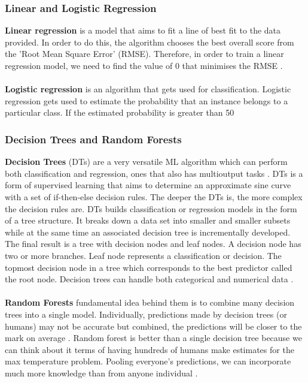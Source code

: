 \documentclass[a4paper,10pt]{article}
\begin{document}
\subsubsection{Linear and Logistic Regression}
\textbf{Linear regression} is a model that aims to fit a line of best fit to the data provided. In order to do this, the algorithm chooses the best overall score from the 'Root Mean Square Error' (RMSE). Therefore, in order to train a linear regression model, we need to find the value of $0$ that minimises the RMSE \cite{geron2019hands}. \\
\\
\textbf{Logistic regression} is an algorithm that gets used for classification. Logistic regression gets used to estimate the probability that an instance belongs to a particular class. If the estimated probability is greater than 50%

\subsubsection{Decision Trees and Random Forests}
\textbf{Decision Trees} (DTs) are a very versatile ML algorithm which can perform both classification and regression, ones that also has multioutput tasks \cite{geron2019hands}. DTs is a form of supervised learning that aims to determine an approximate sine curve with a set of if-then-else decision rules. The deeper the DTs is, the more complex the decision rules are. DTs builds classification or regression models in the form of a tree structure. It breaks down a data set into smaller and smaller subsets while at the same time an associated decision tree is incrementally developed. The final result is a tree with decision nodes and leaf nodes. A decision node has two or more branches. Leaf node represents a classification or decision. The topmost decision node in a tree which corresponds to the best predictor called the root node. Decision trees can handle both categorical and numerical data \cite{mediumtrees}. \\
\\
\textbf{Random Forests} fundamental idea behind them is to combine many decision trees into a single model. Individually, predictions made by decision trees (or humans) may not be accurate but combined, the predictions will be closer to the mark on average \cite{towardsdsrandforest}. Random forest is better than a single decision tree because we can think about it terms of having hundreds of humans make estimates for the max temperature problem.  Pooling everyone's predictions, we can incorporate much more knowledge than from anyone individual \cite{towardsdsrandforest}. 
\end{document}
